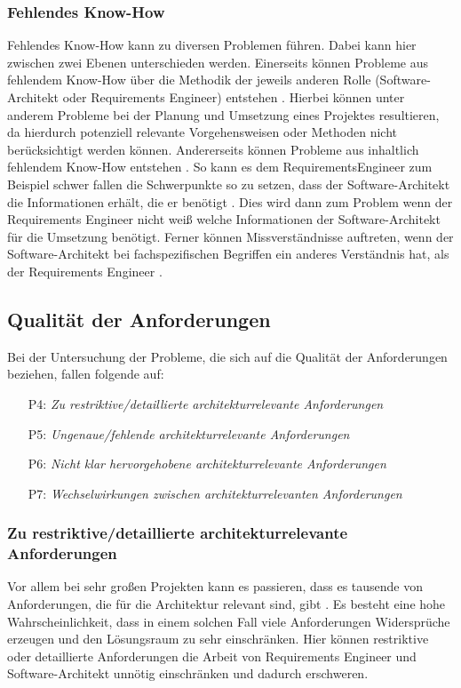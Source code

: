 \subsubsection{Fehlendes Know-How}\label{prob_knowhow}
Fehlendes Know-How kann zu diversen Problemen f\"uhren. Dabei kann hier zwischen zwei Ebenen unterschieden werden. Einerseits k\"onnen Probleme aus fehlendem Know-How \"uber die Methodik der jeweils anderen Rolle (Software-Architekt oder Requirements Engineer) entstehen \cite{Gru01}\cite{Her01}. Hierbei k\"onnen unter anderem Probleme bei der Planung und Umsetzung eines Projektes resultieren, da hierdurch potenziell relevante Vorgehensweisen oder Methoden nicht ber\"ucksichtigt werden k\"onnen. Andererseits k\"onnen Probleme aus inhaltlich fehlendem Know-How entstehen \cite{Gru01}. So kann es dem RequirementsEngineer zum Beispiel schwer fallen die Schwerpunkte so zu setzen, dass der Software-Architekt die Informationen erh\"alt, die er ben\"otigt \cite{Ros03}. Dies wird dann zum Problem wenn der Requirements Engineer nicht wei\ss{} welche Informationen der Software-Architekt f\"ur die Umsetzung ben\"otigt. Ferner k\"onnen Missverst\"andnisse auftreten, wenn der Software-Architekt bei fachspezifischen Begriffen ein anderes Verst\"andnis hat, als der Requirements Engineer \cite{Her01}. \\

\subsection{Qualit\"at der Anforderungen}
Bei der Untersuchung der Probleme, die sich auf die Qualit\"at der Anforderungen beziehen, fallen folgende auf:\\

\begin{itemize}
\item[P4:] \textit{Zu restriktive/detaillierte architekturrelevante Anforderungen}
\item[P5:] \textit{Ungenaue/fehlende architekturrelevante Anforderungen}
\item[P6:] \textit{Nicht klar hervorgehobene architekturrelevante Anforderungen}
\item[P7:] \textit{Wechselwirkungen zwischen architekturrelevanten Anforderungen}\\
\end{itemize}

\subsubsection{Zu restriktive/detaillierte architekturrelevante Anforderungen}
Vor allem bei sehr gro\ss{}en Projekten kann es passieren, dass es tausende von Anforderungen, die f\"ur die Architektur relevant sind, gibt \cite{Gru01}. Es besteht eine hohe Wahrscheinlichkeit, dass in einem solchen Fall viele Anforderungen Widerspr\"uche erzeugen und den L\"osungsraum zu sehr einschr\"anken. Hier k\"onnen restriktive oder detaillierte Anforderungen die Arbeit von Requirements Engineer und Software-Architekt unn\"otig einschr\"anken und dadurch erschweren. \\

